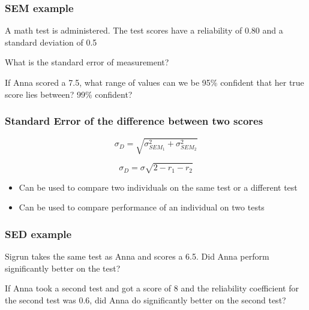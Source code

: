 \documentclass[dvipsnames]{beamer}\usepackage[]{graphicx}\usepackage[]{color}
\begin{document}
\begin{frame}
\frametitle{SEM example}

A math test is administered. The test scores have a reliability of 0.80 and a standard deviation of 0.5

\vspace{1cm}
What is the standard error of measurement?

\vspace{1cm}
If Anna scored a 7.5, what range of values can we be 95\% confident that her true score lies between? 99\% confident?
\end{frame}

\begin{frame}
\frametitle{Standard Error of the difference between two scores}
$$\sigma_D = \sqrt{\sigma_{SEM_1}^2 + \sigma_{SEM_2}^2} $$

$$\sigma_D = \sigma\sqrt{2 - r_1 - r_2} $$

\begin{itemize}
  \item Can be used to compare two individuals on the same test or a different test
  \item Can be used to compare performance of an individual on two tests
\end{itemize}
\end{frame}

\begin{frame}
\frametitle{SED example}
Sigrun takes the same test as Anna and scores a 6.5. Did Anna perform significantly better on the test? 

\vspace{1cm}
If Anna took a second test and got a score of 8 and the reliability coefficient for the second test was 0.6, did Anna do significantly better on the second test?

\end{frame}
\end{document}
